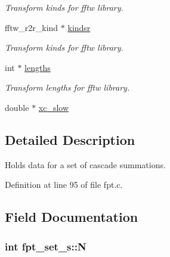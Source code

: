 \begin{CompactItemize}
\begin{CompactList}\small\item\em Transform kinds for fftw library. \item\end{CompactList}\item 
\hypertarget{structfpt__set__s_e8aad5af91f269f07df48add8d7d7882}{
fftw\_\-r2r\_\-kind $\ast$ \hyperlink{structfpt__set__s_e8aad5af91f269f07df48add8d7d7882}{kindsr}}
\label{structfpt__set__s_e8aad5af91f269f07df48add8d7d7882}

\begin{CompactList}\small\item\em Transform kinds for fftw library. \item\end{CompactList}\item 
\hypertarget{structfpt__set__s_197fa4604506c20774f37853a4d04e0c}{
int $\ast$ \hyperlink{structfpt__set__s_197fa4604506c20774f37853a4d04e0c}{lengths}}
\label{structfpt__set__s_197fa4604506c20774f37853a4d04e0c}

\begin{CompactList}\small\item\em Transform lengths for fftw library. \item\end{CompactList}\item 
\hypertarget{structfpt__set__s_97d7abaf8a8772aebc59ee20b6d41c93}{
double $\ast$ \hyperlink{structfpt__set__s_97d7abaf8a8772aebc59ee20b6d41c93}{xc\_\-slow}}
\label{structfpt__set__s_97d7abaf8a8772aebc59ee20b6d41c93}

\end{CompactItemize}


\subsection{Detailed Description}
Holds data for a set of cascade summations. 

Definition at line 95 of file fpt.c.

\subsection{Field Documentation}
\hypertarget{structfpt__set__s_79ef24e290c43364646520ab94cf43e5}{
\subsubsection{\setlength{\rightskip}{0pt plus 5cm}int {\bf fpt\_\-set\_\-s::N}}}
\label{structfpt__set__s_79ef24e290c43364646520ab94cf43e5}


